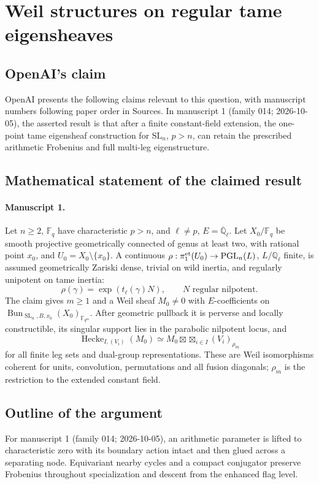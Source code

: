 \documentclass[11pt]{article}
\begin{document}
\section*{Weil structures on regular tame eigensheaves}

\subsection{OpenAI's claim}
OpenAI presents the following claims relevant to this question, with manuscript numbers following paper order in Sources. In manuscript 1 (family 014; 2026-10-05), the asserted result is that after a finite constant-field extension, the one-point tame eigensheaf construction for $\mathrm{SL}_n$, $p>n$, can retain the prescribed arithmetic Frobenius and full multi-leg eigenstructure.

\subsection{Mathematical statement of the claimed result}
\paragraph{Manuscript 1.}
Let $n\ge2$, $\mathbb F_q$ have characteristic $p>n$, and $\ell\ne p$, $E=\overline{\mathbb Q}_{\ell}$. Let $X_0/\mathbb F_q$ be smooth projective geometrically connected of genus at least two, with rational point $x_0$, and $U_0=X_0\setminus\{x_0\}$. A continuous $\rho:\pi_1^{\rm et}(U_0)\to\operatorname{PGL}_n(L)$, $L/\mathbb Q_{\ell}$ finite, is assumed geometrically Zariski dense, trivial on wild inertia, and regularly unipotent on tame inertia:
\[
 \rho(\gamma)=\exp(t_{\ell}(\gamma)N),\qquad N\text{ regular nilpotent}.
\]
The claim gives $m\ge1$ and a Weil sheaf $M_0\ne0$ with $E$-coefficients on $\operatorname{Bun}_{\operatorname{SL}_n,B,x_0}(X_0)_{\mathbb F_{q^m}}$. After geometric pullback it is perverse and locally constructible, its singular support lies in the parabolic nilpotent locus, and
\[
 \operatorname{Hecke}_{I,(V_i)}(M_0)\simeq
 M_0\boxtimes\mathop{\boxtimes}_{i\in I}(V_i)_{\rho_m}
\]
for all finite leg sets and dual-group representations. These are Weil isomorphisms coherent for units, convolution, permutations and all fusion diagonals; $\rho_m$ is the restriction to the extended constant field.

\subsection{Outline of the argument}
For manuscript 1 (family 014; 2026-10-05), an arithmetic parameter is lifted to characteristic zero with its boundary action intact and then glued across a separating node. Equivariant nearby cycles and a compact conjugator preserve Frobenius throughout specialization and descent from the enhanced flag level.
\end{document}
